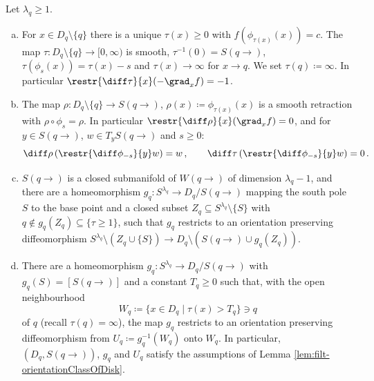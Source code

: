\begin{lemma}\label{lem:filt-tauRho}
	Let $\lambda_q\geq 1$.
	\begin{enumerate}[(a)]
		\item For $x\in D_q\setminus\{q\}$ there is a unique $\tau(x)\geq 0$ with $f(\phi_{\tau(x)}(x))=c$. The map $\tau:D_q\setminus\{q\}\to[0,\infty)$ is smooth, $\tau^{-1}(0)=S(q\to)$, $\tau(\phi_s(x))=\tau(x)-s$ and $\tau(x)\to\infty$ for $x\to q$. We set $\tau(q)\coloneq\infty$. In particular $\restr{\diff\tau}{x}(-\grad_x f)=-1$.
		\item The map $\rho:D_q\setminus\{q\}\to S(q\to)$, $\rho(x)\coloneq \phi_{\tau(x)}(x)$ is a smooth retraction with $\rho\circ\phi_s=\rho$. In particular $\restr{\diff\rho}{x}(\grad_xf)=0$, and for $y\in S(q\to)$, $w\in T_yS(q\to)$ and $s\geq 0$:
		\begin{equation*}
			\diff\rho\left(\restr{\diff\phi_{-s}}{y}w\right)=w\,,\qquad \diff\tau\left(\restr{\diff\phi_{-s}}{y}w\right)=0\,.
		\end{equation*}
		\item $S(q\to)$ is a closed submanifold of $W(q\to)$ of dimension $\lambda_q-1$, and there are a homeomorphism $g_q:S^{\lambda_q}\to D_q/S(q\to)$ mapping the south pole $S$ to the base point and a closed subset $Z_q\subseteq S^{\lambda_q}\setminus\{S\}$ with $q\notin g_q(Z_q)\subseteq\{\tau\geq 1\}$, such that $g_q$ restricts to an orientation preserving diffeomorphism $S^{\lambda_q}\setminus (Z_q\cup\{S\})\to D_q\setminus \left(S(q\to)\cup g_q(Z_q)\right)$.
		\item There are a homeomorphism $g_q:S^{\lambda_q}\to D_q/S(q\to)$ with $g_q(S)=[S(q\to)]$ and a constant $T_q\geq0$ such that, with the open neighbourhood
\begin{equation*}
	W_q\coloneq\{x\in D_q\mid\tau(x)>T_q\}\ni q
\end{equation*}
of $q$ (recall $\tau(q)=\infty$), the map $g_q$ restricts to an orientation preserving diffeomorphism from $U_q\coloneq g_q^{-1}(W_q)$ onto $W_q$. In particular, $(D_q,S(q\to))$, $g_q$ and $U_q$ satisfy the assumptions of Lemma \ref{lem:filt-orientationClassOfDisk}.
	\end{enumerate}
\end{lemma}
